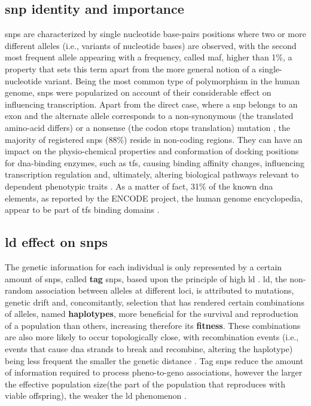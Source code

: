 \subsection{\Acf{snp} identity and importance}
\Acfp{snp} are characterized by single nucleotide base-pairs positions where two or more different alleles (i.e., variants of nucleotide bases) are observed, with the second most frequent allele appearing with a frequency, called \ac{maf}, higher than 1\%, a property that sets this term apart from the more general notion of a single-nucleotide variant. Being the most common type of polymorphism in the human genome, \acp{snp} were popularized on account of their considerable effect on influencing transcription. Apart from the direct case, where a \ac{snp} belongs to an exon and the alternate allele corresponds to a non-synonymous (the translated amino-acid differs) or a nonsense (the codon stops translation) mutation \cite{Ramensky2002}, the majority of registered \acp{snp} (88\%) reside in non-coding regions. They can have an impact on the physio-chemical properties and conformation of docking positions for \ac{dna}-binding enzymes, such as \acp{tf}, causing binding affinity changes, influencing transcription regulation and, ultimately, altering biological pathways relevant to dependent phenotypic traits \cite{Nishizaki2020}. As a matter of fact, 31\% of the known \ac{dna} elements, as reported by the ENCODE project, the human genome encyclopedia, appear to be part of \acp{tf} binding domains \cite{Dunham2012}. 

\subsection{\Acf{ld} effect on \acp{snp}}
The genetic information for each individual is only represented by a certain amount of \acp{snp}, called \textbf{tag} \acp{snp}, based upon the principle of high \acf{ld} \cite{Visscher2012, Belmont2003}. \ac{ld}, the non-random association between alleles at different loci, is attributed to mutations, genetic drift and, concomitantly, selection \cite{Visscher2012} that has rendered certain combinations of alleles, named \textbf{haplotypes}, more beneficial for the survival and reproduction of a population than others, increasing therefore its \textbf{fitness}. These combinations are also more likely to occur topologically close, with recombination events (i.e., events that cause \ac{dna} strands to break and recombine, altering the haplotype) being less frequent the smaller the genetic distance \cite{Visscher2012}. Tag \acp{snp} reduce the amount of information required to process pheno-to-geno associations, however the larger the effective population size(the part of the population that reproduces with viable offspring), the weaker the \ac{ld} phenomenon \cite{Visscher2012}.

